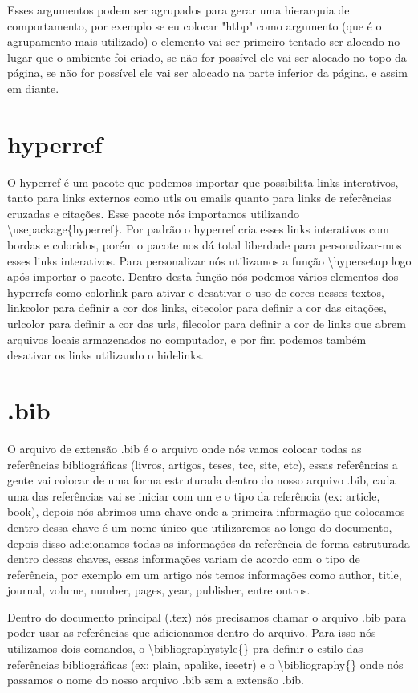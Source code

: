 Esses argumentos podem ser agrupados para gerar uma hierarquia de comportamento, por exemplo se eu colocar "htbp" como argumento (que é o agrupamento mais utilizado) o elemento vai ser primeiro tentado ser alocado no lugar que o ambiente foi criado, se não for possível ele vai ser alocado no topo da página, se não for possível ele vai ser alocado na parte inferior da página, e assim em diante.

\section{hyperref}
O hyperref é um pacote que podemos importar que possibilita links interativos, tanto para links externos como utls ou emails quanto para links de referências cruzadas e citações. Esse pacote nós importamos utilizando \textbackslash usepackage\{hyperref\}.
Por padrão o hyperref cria esses links interativos com bordas e coloridos, porém o pacote nos dá total liberdade para personalizar-mos esses links interativos. Para personalizar nós utilizamos a função \textbackslash hypersetup logo após importar o pacote. Dentro desta função nós podemos vários elementos dos hyperrefs como colorlink para ativar e desativar o uso de cores nesses textos, linkcolor para definir a cor dos links, citecolor para definir a cor das citações, urlcolor para definir a cor das urls, filecolor para definir a cor de links que abrem arquivos locais armazenados no computador, e por fim podemos também desativar os links utilizando o hidelinks.

\section{.bib}
O arquivo de extensão .bib é o arquivo onde nós vamos colocar todas as referências bibliográficas (livros, artigos, teses, tcc, site, etc), essas referências a gente vai colocar de uma forma estruturada dentro do nosso arquivo .bib, cada uma das referências vai se iniciar com um \@ e o tipo da referência (ex: \@ article, \@ book), depois nós abrimos uma chave onde a primeira informação que colocamos dentro dessa chave é um nome único que utilizaremos ao longo do documento, depois disso adicionamos todas as informações da referência de forma estruturada dentro dessas chaves, essas informações variam de acordo com o tipo de referência, por exemplo em um artigo nós temos informações como author, title, journal, volume, number, pages, year, publisher, entre outros.

Dentro do documento principal (.tex) nós precisamos chamar o arquivo .bib para poder usar as referências que adicionamos dentro do arquivo. Para isso nós utilizamos dois comandos, o \textbackslash bibliographystyle\{\} pra definir o estilo das referências bibliográficas (ex: plain, apalike, ieeetr) e o \textbackslash bibliography\{\} onde nós passamos o nome do nosso arquivo .bib sem a extensão .bib.

